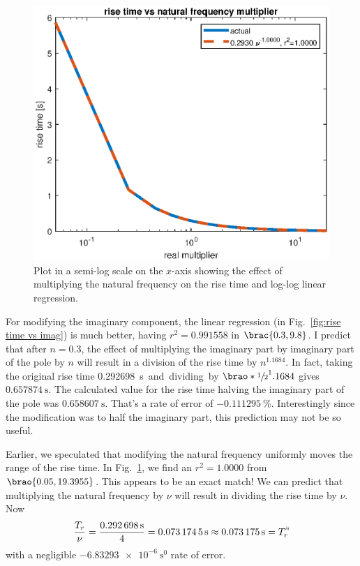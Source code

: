 \documentclass[12pt]{article}
\DeclarePairedDelimiter\brao()%
\DeclarePairedDelimiter\brac[]%
\newcommand{\setprime}[2][1]{%
    {#2}^{%
        \raisebox{1pt}{%
            \scalebox{0.5}{%
                \itshape\sffamily\uppercase%
                \expandafter{%
                    \romannumeral#1%
                }%
            }%
        }
    }%
}%
\begin{document}
\begin{figure}
    \centering
    \includegraphics[width=\linewidth]{img/part01_rise_time_vs_wn.eps}
    \caption{Plot in a semi-log scale on the $x$-axis
    showing the effect of multiplying the natural frequency on the rise time and log-log linear regression.}
    \label{fig:rise time vs wn}
\end{figure}

For modifying the imaginary component, the linear regression
(in Fig.~\ref{fig:rise time vs imag})
is much better, having $r^2 = 0.991558$ in $\brac{0.3, 9.8}$.
I predict that after $n = 0.3$, the effect of multiplying the imaginary part by imaginary part of the pole by $n$ will result in a division of the rise time by $n^{1.1684}$.
In fact, taking the original rise time \SI{0.292698}\second and dividing by $\brao*{\sfrac12}^1.1684$ gives $\SI{0.657874}\second$.
The calculated value for the rise time halving the imaginary part of the pole was $\SI{0.658607}\second$.
That's a rate of error of $\SI{-0.111295}\percent$.
Interestingly since the modification was to half the imaginary part, this prediction may not be so useful.

Earlier, we speculated that modifying the natural frequency uniformly moves the range of the rise time.
In Fig.~\ref{fig:rise time vs wn}, we find an $r^2 = 1.0000$ from $\brao{0.05, 19.3955}$.
This appears to be an exact match!
We can predict that multiplying the natural frequency by $\nu$ will result in dividing the rise time by $\nu$.
Now
\begin{equation}
    \frac{T_r}\nu = \frac{\SI{0.292698}\second}4 = \SI{0.0731745}\second \approx \SI{0.073175}\second = \setprime[3]{T}_r
\end{equation}
with a negligible $\SI{-6.83293e-6}{\second^0}$ rate of error.
\end{document}
